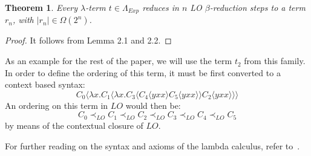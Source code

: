 \documentclass[11pt]{article}
\newtheorem{theorem}{Theorem}[section]
\begin{document}
\begin{theorem}
Every $\lambda$-term $t \in \Lambda_{Exp}$ reduces in $n$ LO $\beta$-reduction steps to a term $r_n$, with $|r_n| \in \Omega(2^n)$.
\end{theorem}
\begin{proof}
It follows from Lemma 2.1 and 2.2.
\end{proof}

As an example for the rest of the paper, we will use the term $t_{2}$ from this family. In order to define the ordering of this term, it must be first converted to a context based syntax:
\[ C_{0} \langle \lambda x. C_{1} \langle \lambda x. C_{3} \langle C_{4} \langle yxx \rangle C_{5} \langle yxx \rangle \rangle C_{2} \langle yxx \rangle \rangle \rangle \]
An ordering on this term in $LO$ would then be:
\begin{equation}
 C_{0} \prec_{LO} C_{1} \prec_{LO} C_{2} \prec_{LO} C_{3} \prec_{LO} C_{4} \prec_{LO} C_{5}
\end{equation}
by means of the contextual closure of $LO$.

For further reading on the syntax and axioms of the lambda calculus, refer to~\cite{barendregt1984lambda}.
\end{document}
